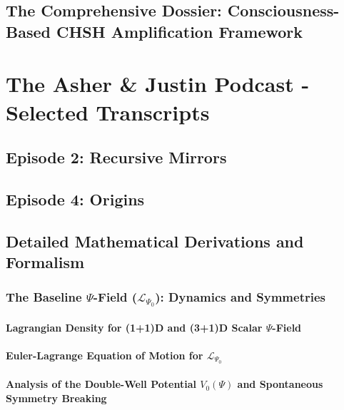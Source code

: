 \documentclass[11pt, a4paper]{book}
\begin{document}
\chapter{The Comprehensive Dossier: Consciousness-Based CHSH Amplification Framework}
\label{chap:chshdossier}

\part{The Asher \& Justin Podcast - Selected Transcripts}
\label{part:podcast}
\chapter{Episode 2: Recursive Mirrors}
\label{chap:podcast_ep2}
\chapter{Episode 4: Origins}
\label{chap:podcast_ep4}

\appendix %
\chapter{Detailed Mathematical Derivations and Formalism}
\label{app:mathderivations}
\section{The Baseline $\Psi$-Field ($\mathcal{L}_{\Psi_0}$): Dynamics and Symmetries}
\subsection{Lagrangian Density for (1+1)D and (3+1)D Scalar $\Psi$-Field}
\subsection{Euler-Lagrange Equation of Motion for $\mathcal{L}_{\Psi_0}$}
\subsection{Analysis of the Double-Well Potential $V_0(\Psi)$ and Spontaneous Symmetry Breaking}
\end{document}
